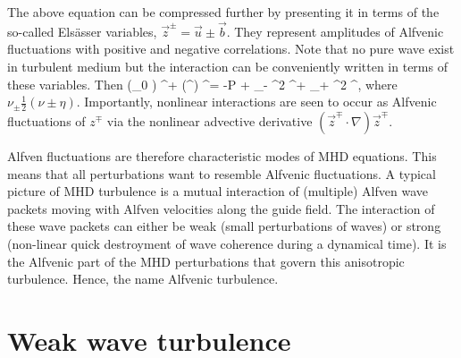\documentclass[usenatbib,twocolumn]{aastex63}
\begin{document}
The above equation can be compressed further by presenting it in terms of the so-called Els\"asser variables, $\vec{z}^\pm = \vec{u} \pm \vec{b}$.
They represent amplitudes of Alfvenic fluctuations with positive and negative correlations.
Note that no pure wave exist in turbulent medium but the interaction can be conveniently written in terms of these variables.
Then
\be
     \mp (_0 \cdot \nabla) ^\pm + (^\mp \cdot \nabla) ^\pm = -\nabla P  + \nu_- \nabla^2 ^\pm  + \nu_+ \nabla^2 ^\mp,
\ee
where $\nu_\pm \frac{1}{2} (\nu \pm \eta)$.
Importantly, nonlinear interactions are seen to occur as Alfvenic fluctuations of $z^\mp$ via the nonlinear advective derivative $(\vec{z}^\mp \cdot \nabla) \vec{z}^\mp$.

%


Alfven fluctuations are therefore characteristic modes of MHD equations.
This means that all perturbations want to resemble Alfvenic fluctuations.
A typical picture of MHD turbulence is a mutual interaction of (multiple) Alfven wave packets moving with Alfven velocities along the guide field.
The interaction of these wave packets can either be weak (small perturbations of waves) or strong (non-linear quick destroyment of wave coherence during a dynamical time).
It is the Alfvenic part of the MHD perturbations that govern this anisotropic turbulence. 
Hence, the name Alfvenic turbulence.



\section{Weak wave turbulence}
\end{document}
